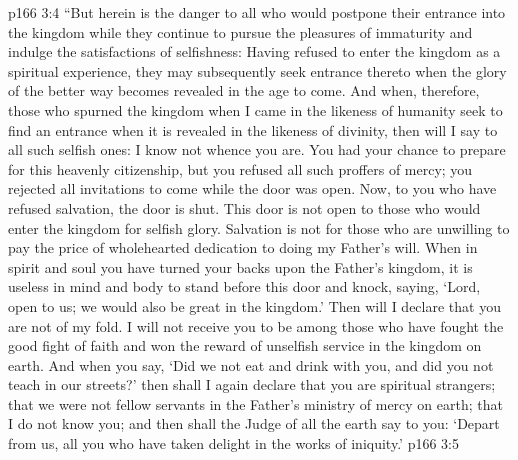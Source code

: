 \vs p166 3:4 “But herein is the danger to all who would postpone their entrance into the kingdom while they continue to pursue the pleasures of immaturity and indulge the satisfactions of selfishness: Having refused to enter the kingdom as a spiritual experience, they may subsequently seek entrance thereto when the glory of the better way becomes revealed in the age to come. And when, therefore, those who spurned the kingdom when I came in the likeness of humanity seek to find an entrance when it is revealed in the likeness of divinity, then will I say to all such selfish ones: I know not whence you are. You had your chance to prepare for this heavenly citizenship, but you refused all such proffers of mercy; you rejected all invitations to come while the door was open. Now, to you who have refused salvation, the door is shut. This door is not open to those who would enter the kingdom for selfish glory. Salvation is not for those who are unwilling to pay the price of wholehearted dedication to doing my Father’s will. When in spirit and soul you have turned your backs upon the Father’s kingdom, it is useless in mind and body to stand before this door and knock, saying, ‘Lord, open to us; we would also be great in the kingdom.’ Then will I declare that you are not of my fold. I will not receive you to be among those who have fought the good fight of faith and won the reward of unselfish service in the kingdom on earth. And when you say, ‘Did we not eat and drink with you, and did you not teach in our streets?’ then shall I again declare that you are spiritual strangers; that we were not fellow servants in the Father’s ministry of mercy on earth; that I do not know you; and then shall the Judge of all the earth say to you: ‘Depart from us, all you who have taken delight in the works of iniquity.’
\vs p166 3:5 
